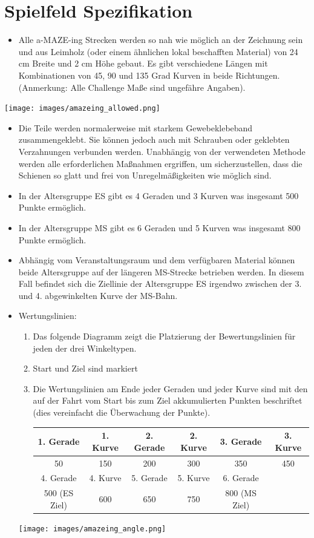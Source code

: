 \documentclass[a4paper,12pt]{article}
\begin{document}
\section{Spielfeld Spezifikation}
\begin{itemize}
	\item Alle a-MAZE-ing Strecken werden so nah wie möglich an der
		Zeichnung sein und aus Leimholz (oder einem ähnlichen lokal
		beschafften Material) von 24 cm Breite und 2 cm Höhe gebaut. Es
		gibt verschiedene Längen mit Kombinationen von 45, 90 und 135
		Grad Kurven in beide Richtungen. (Anmerkung: Alle Challenge
		Maße sind ungefähre Angaben).
\end{itemize}
\texttt{[image: images/amazeing\_allowed.png]}
\begin{itemize}
	\item Die Teile werden normalerweise mit starkem Gewebeklebeband
		zusammengeklebt. Sie können jedoch auch mit Schrauben oder
		geklebten Verzahnungen verbunden werden. Unabhängig von der
		verwendeten Methode werden alle erforderlichen Maßnahmen
		ergriffen, um sicherzustellen, dass die Schienen so glatt und
		frei von Unregelmäßigkeiten wie möglich sind.
	\item In der Altersgruppe ES gibt es 4 Geraden und 3 Kurven was
		insgesamt 500 Punkte ermöglich.
	\item In der Altersgruppe MS gibt es 6 Geraden und 5 Kurven was
		insgesamt 800 Punkte ermöglich.
	\item Abhängig vom Veranstaltungsraum und dem verfügbaren Material
		können beide Altersgruppe auf der längeren MS-Strecke betrieben
		werden. In diesem Fall befindet sich die Ziellinie der
		Altersgruppe ES irgendwo zwischen der 3. und 4. abgewinkelten
		Kurve der MS-Bahn.
	\item Wertungslinien:
		\begin{enumerate}
			\item Das folgende Diagramm zeigt die Platzierung der
				Bewertungslinien für jeden der drei
				Winkeltypen.
			\item Start und Ziel sind markiert
			\item Die Wertungslinien am Ende jeder Geraden und
				jeder Kurve sind mit den auf der Fahrt vom
				Start bis zum Ziel akkumulierten Punkten
				beschriftet (dies vereinfacht die Überwachung
				der Punkte).
				\begin{center}
					\begin{tabular}{|c|c|c|c|c|c|} \hline
						\rowcolor{Gray}
						1. Gerade & 1. Kurve & 2. Gerade & 2. Kurve & 3. Gerade & 3. Kurve  \\ \hline
						50 & 150 & 200 & 300 & 350 & 450  \\ \hline
						\rowcolor{Gray}
						4. Gerade & 4. Kurve & 5. Gerade & 5. Kurve & 6. Gerade & \\ \hline
						500 (ES Ziel) & 600 & 650 & 750 & 800 (MS Ziel) & \\ \hline
					\end{tabular}
				\end{center}
		\end{enumerate}
		\texttt{[image: images/amazeing\_angle.png]}
\end{itemize}
\end{document}
